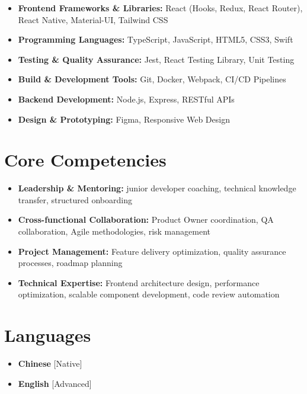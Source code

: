 \documentclass[11pt,a4paper,sans]{moderncv}
\begin{document}
\begin{itemize}[label=\textbullet]
  \item \textbf{Frontend Frameworks \& Libraries:} React (Hooks, Redux, React Router), React Native, Material-UI, Tailwind CSS
  \item \textbf{Programming Languages:} TypeScript, JavaScript, HTML5, CSS3, Swift
  \item \textbf{Testing \& Quality Assurance:} Jest, React Testing Library, Unit Testing
  \item \textbf{Build \& Development Tools:} Git, Docker, Webpack, CI/CD Pipelines
  \item \textbf{Backend Development:} Node.js, Express, RESTful APIs
  \item \textbf{Design \& Prototyping:} Figma, Responsive Web Design
\end{itemize}

\section{Core Competencies}

\begin{itemize}[label=\textbullet]
  \item \textbf{Leadership \& Mentoring:} junior developer coaching, technical knowledge transfer, structured onboarding
  \item \textbf{Cross-functional Collaboration:} Product Owner coordination, QA collaboration, Agile methodologies, risk management
  \item \textbf{Project Management:} Feature delivery optimization, quality assurance processes, roadmap planning
  \item \textbf{Technical Expertise:} Frontend architecture design, performance optimization, scalable component development, code review automation
\end{itemize}
\section{Languages}

\begin{multicols}{2}
  \begin{itemize}[label=\textbullet]
    \item \textbf{Chinese} [Native]
    \item \textbf{English} [Advanced]
  \end{itemize}
\end{multicols}
\end{document}
